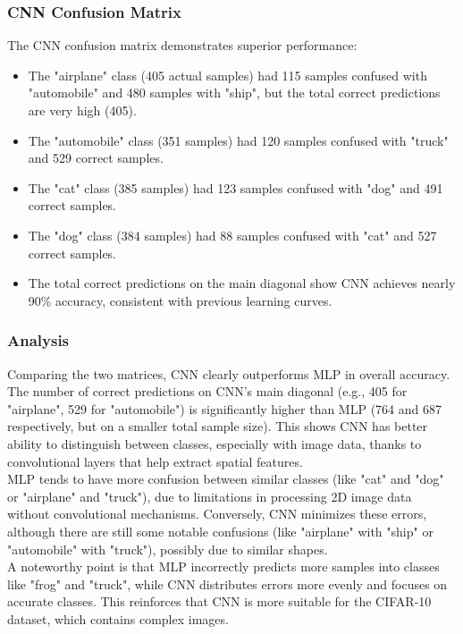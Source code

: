 \documentclass[12pt]{article}
\begin{document}
\subsubsection{CNN Confusion Matrix}

The CNN confusion matrix demonstrates superior performance:

\begin{itemize}
    \item The "airplane" class (405 actual samples) had 115 samples confused with 
    "automobile" and 480 samples with "ship", but the total correct predictions are 
    very high (405).
    \item The "automobile" class (351 samples) had 120 samples confused with 
    "truck" and 529 correct samples.
    \item The "cat" class (385 samples) had 123 samples confused with "dog" and 491 
    correct samples.
    \item The "dog" class (384 samples) had 88 samples confused with "cat" and 527 
    correct samples.
    \item The total correct predictions on the main diagonal show CNN achieves 
    nearly 90\% accuracy, consistent with previous learning curves.
\end{itemize}

\subsubsection{Analysis}

Comparing the two matrices, CNN clearly outperforms MLP in overall accuracy. The 
number of correct predictions on CNN's main diagonal (e.g., 405 for "airplane", 529 
for "automobile") is significantly higher than MLP (764 and 687 respectively, but 
on a smaller total sample size). This shows CNN has better ability to distinguish 
between classes, especially with image data, thanks to convolutional layers that 
help extract spatial features.\\

MLP tends to have more confusion between similar classes (like "cat" and "dog" or 
"airplane" and "truck"), due to limitations in processing 2D image data without 
convolutional mechanisms. Conversely, CNN minimizes these errors, although there 
are still some notable confusions (like "airplane" with "ship" or "automobile" with 
"truck"), possibly due to similar shapes.\\

A noteworthy point is that MLP incorrectly predicts more samples into classes like 
"frog" and "truck", while CNN distributes errors more evenly and focuses on 
accurate classes. This reinforces that CNN is more suitable for the CIFAR-10 
dataset, which contains complex images.
\end{document}
